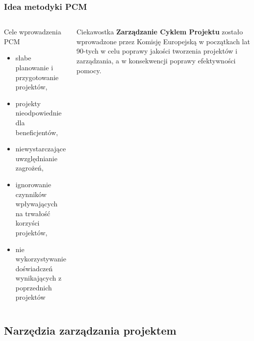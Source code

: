 \documentclass{beamer}
\begin{document}
\begin{frame}\frametitle{Idea metodyki PCM}
    \begin{columns}
    
        	\centering
        	
        	\begin{block}{Cele wprowadzenia PCM}
        	    \begin{itemize}
        	        \item słabe planowanie i przygotowanie projektów,
        	        \item projekty nieodpowiednie dla beneficjentów, 
        	        \item niewystarczające uwzględnianie zagrożeń, 
        	        \item ignorowanie czynników wpływających na trwałość korzyści projektów,
        	        \item nie wykorzystywanie doświadczeń wynikających z poprzednich projektów
        	    \end{itemize}
            \end{block}
        
    		\centering
    		
    		\begin{exampleblock}{Ciekawostka}
    	        \textbf{Zarządzanie Cyklem Projektu} zostało wprowadzone przez Komisję Europejską w początkach lat 90-tych w celu poprawy jakości tworzenia projektów i zarządzania, a w konsekwencji poprawy efektywności pomocy.
            \end{exampleblock}
			
	\end{columns}
	
\end{frame}


\subsection{Narzędzia zarządzania projektem}
\end{document}
